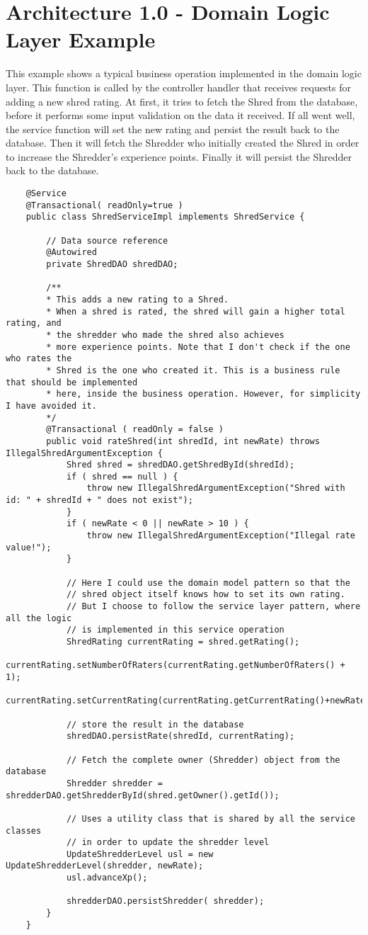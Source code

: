 \section{Architecture 1.0 - Domain Logic Layer Example}
\label{sec:abiz}
This example shows a typical business operation implemented in the domain logic layer. This function is called by the controller handler that receives requests for adding a new shred rating. At first, it tries to fetch the Shred from the database, before it performs some input validation on the data it received. If all went well, the service function will set the new rating and persist the result back to the database. Then it will fetch the Shredder who initially created the Shred in order to increase the Shredder's experience points. Finally it will persist the Shredder back to the database. 
	
\begin{lstlisting}
	@Service
	@Transactional( readOnly=true )
	public class ShredServiceImpl implements ShredService {
	
		// Data source reference
		@Autowired
		private ShredDAO shredDAO;	
		
		/**
		* This adds a new rating to a Shred. 
		* When a shred is rated, the shred will gain a higher total rating, and
		* the shredder who made the shred also achieves
		* more experience points. Note that I don't check if the one who rates the 
		* Shred is the one who created it. This is a business rule that should be implemented
		* here, inside the business operation. However, for simplicity I have avoided it.
		*/
		@Transactional ( readOnly = false )
		public void rateShred(int shredId, int newRate) throws IllegalShredArgumentException {
			Shred shred = shredDAO.getShredById(shredId);
			if ( shred == null ) {
				throw new IllegalShredArgumentException("Shred with id: " + shredId + " does not exist");
			}
			if ( newRate < 0 || newRate > 10 ) {
				throw new IllegalShredArgumentException("Illegal rate value!");
			}
	
			// Here I could use the domain model pattern so that the
			// shred object itself knows how to set its own rating.
			// But I choose to follow the service layer pattern, where all the logic
			// is implemented in this service operation
			ShredRating currentRating = shred.getRating();
			currentRating.setNumberOfRaters(currentRating.getNumberOfRaters() + 1);
			currentRating.setCurrentRating(currentRating.getCurrentRating()+newRate);
			
			// store the result in the database
			shredDAO.persistRate(shredId, currentRating);		
			
			// Fetch the complete owner (Shredder) object from the database
			Shredder shredder = shredderDAO.getShredderById(shred.getOwner().getId());
			
			// Uses a utility class that is shared by all the service classes
			// in order to update the shredder level
			UpdateShredderLevel usl = new UpdateShredderLevel(shredder, newRate);
			usl.advanceXp();
			
			shredderDAO.persistShredder( shredder);
		}
	}
	\end{lstlisting}
	
